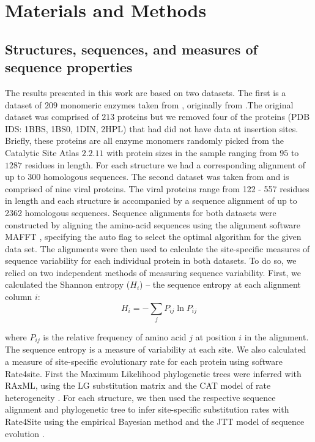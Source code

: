 \documentclass[12pt]{article}
\begin{document}
\section{Materials and Methods}
\label{sec:mam}

    \subsection*{Structures, sequences, and measures of sequence properties } 
    The results presented in this work are based on two datasets. The first is a dataset of $209$ monomeric enzymes taken from \cite{Huangetal2014}, originally from \cite{Yehetal2014}.The original dataset was comprised of $213$ proteins but we removed four of the proteins (PDB IDS: 1BBS, 1BS0, 1DIN, 2HPL) that had did not have data at insertion sites. Briefly, these proteins are all enzyme monomers   randomly picked from the Catalytic Site Atlas $2.2.11$ \citep{Porteretal2004} with protein sizes in the sample ranging from $95$ to $1287$ residues in length. For each structure we had a corresponding alignment of up to 300 homologous sequences.  The second dataset was taken from \cite{Shahmoradietal2014} and is comprised of nine viral proteins. The viral proteins range from 122 - 557 residues in length and each structure is accompanied by a sequence alignment of up to 2362 homologous sequences. Sequence alignments for both datasets were constructed by aligning the amino-acid sequences using the alignment software MAFFT \citep{Katohetal2002, Katohetal2005}, specifying the auto flag to select the optimal algorithm for the given data set. The alignments were then used to calculate the site-specific measures of sequence variability for each individual protein in both datasets. To do so, we relied on two independent methods of measuring sequence variability. First, we calculated the Shannon entropy ($H_i$) -- the sequence entropy at each alignment column $i$:
    \begin{equation}
        \label{eqn:shannon}
        H_i = -\sum_j P_{ij}\ln P_{ij}
    \end{equation}

    where $P_{ij}$ is the relative frequency of amino acid $j$ at position $i$ in the alignment. The sequence entropy is a measure of variability at each site. We also calculated a measure of site-specific evolutionary rate for each protein using software Rate4site. First the Maximum Likelihood phylogenetic trees were inferred with RAxML, using the LG substitution matrix and the CAT model of rate heterogeneity \citep{Stamatakis2006, Stamatakis2014}. For each structure, we then used the respective sequence alignment and phylogenetic tree to infer site-specific substitution rates with Rate4Site using the empirical Bayesian method and the JTT model of sequence evolution \citep{Mayroseetal2004}.
\end{document}
